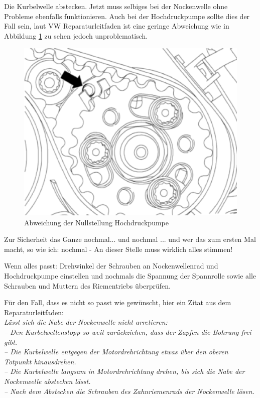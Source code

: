 \documentclass[twoside,a4paper]{refart}
\begin{document}
Die Kurbelwelle abstecken. Jetzt muss selbiges bei der Nockenwelle ohne Probleme ebenfalls funktionieren. Auch bei der Hochdruckpumpe sollte dies der Fall sein, laut VW Reparaturleitfaden ist eine geringe Abweichung wie in Abbildung \ref{fig:hdp} zu sehen jedoch unproblematisch.

\begin{figure}[htb]
	\begin{center}
		\includegraphics[width=\textwidth]{HDPabweichung}
		\caption{Abweichung der Nullstellung Hochdruckpumpe}
		\label{fig:hdp}
	\end{center}
\end{figure}


Zur Sicherheit das Ganze nochmal... und nochmal ... und wer das zum ersten Mal macht, so wie ich: nochmal - An dieser Stelle muss wirklich alles stimmen!

Wenn alles passt: Drehwinkel der Schrauben an Nockenwellenrad und Hochdruckpumpe einstellen und nochmals die Spannung der Spannrolle sowie alle Schrauben und Muttern des Riementriebs überprüfen.

Für den Fall, dass es nicht so passt wie gewünscht, hier ein Zitat aus dem Reparaturleitfaden:\\
\textit{Lässt sich die Nabe der Nockenwelle nicht arretieren:\\
– Den Kurbelwellenstopp so weit zurückziehen, dass
der Zapfen die Bohrung frei gibt.\\
– Die Kurbelwelle entgegen der Motordrehrichtung etwas über
den oberen Totpunkt hinausdrehen.\\
– Die Kurbelwelle langsam in Motordrehrichtung drehen, bis
sich die Nabe der Nockenwelle abstecken lässt.\\
– Nach dem Abstecken die Schrauben des Zahnriemenrads der
Nockenwelle lösen.\\}
\end{document}
